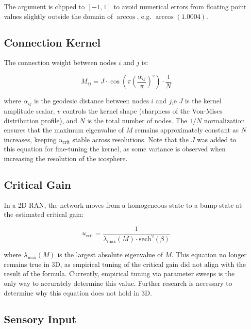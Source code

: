 \documentclass[12pt, letterpaper]{article}
\begin{document}
The argument is clipped to $[-1, 1]$ to avoid numerical errors from floating point values slightly outside the domain of $\arccos$, e.g. $\arccos(1.0004)$.

\subsection{Connection Kernel}

The connection weight between nodes $i$ and $j$ is:

\begin{equation}
    M_{ij} = J \cdot \cos\!\left(\pi \left(\frac{\alpha_{ij}}{\pi}\right)^v\right) \cdot \frac{1}{N}
\end{equation}

where $\alpha_{ij}$ is the geodesic distance between nodes $i$ and $j$,e $J$ is the kernel amplitude scalar, $v$ controls the kernel shape (sharpness of the Von-Mises distribution profile), and $N$ is the total number of nodes. The $1/N$ normalization ensures that the maximum eigenvalue of $M$ remains approximately constant as $N$ increases, keeping $u_{\text{crit}}$ stable across resolutions. Note that the $J$ was added to this equation for fine-tuning the kernel, as some variance is observed when increasing the resolution of the icosphere.

\subsection{Critical Gain}

In a 2D RAN, the network moves from a homogeneous state to a bump state at the estimated critical gain:

\begin{equation}
    u_{\text{crit}} = \frac{1}{\lambda_{\max}(M) \cdot \text{sech}^2(\beta)}
\end{equation}

where $\lambda_{\max}(M)$ is the largest absolute eigenvalue of $M$. This equation no longer remains true in 3D, as empirical tuning of the critical gain did not align with the result of the formula. Currently, empirical tuning via parameter sweeps is the only way to accurately determine this value. Further research is necessary to determine why this equation does not hold in 3D.

\subsection{Sensory Input}
\end{document}
